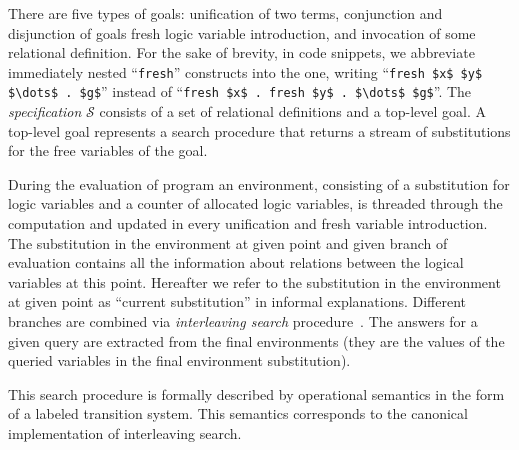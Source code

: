 There are five types of goals: unification of two terms, conjunction and disjunction of goals
fresh logic variable introduction, and invocation of some relational definition. For the sake of brevity, in code snippets, we abbreviate
immediately nested ``\lstinline|fresh|'' constructs into the one, writing ``\lstinline|fresh $x$ $y$ $\dots$ . $g$|'' instead of
``\lstinline|fresh $x$ . fresh $y$ . $\dots$ $g$|''. The \emph{specification} $\mathcal{S}$ consists of a set of relational definitions and a top-level goal.
A top-level goal represents a search procedure that returns a stream of substitutions for the free variables of the goal.

During the evaluation of \mK program an environment, consisting of a substitution for logic variables and a counter of allocated logic
variables, is threaded through the computation and updated in every unification and fresh variable introduction.
The substitution in the environment at given point and given branch of evaluation contains all the information about relations between
the logical variables at this point. Hereafter we refer to the substitution in the environment at given point as ``current substitution''
in informal explanations.
Different branches are combined via \emph{interleaving search} procedure~\cite{InterleavingSearch}.
The answers for a given query are extracted from the final environments (they are the values of the queried variables in the final environment substitution).

This search procedure is formally described by operational semantics in the form of a labeled transition system.
This semantics corresponds to the canonical implementation of interleaving search. 

